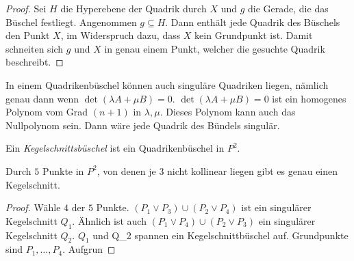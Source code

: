 \documentclass[../main.tex]{subfiles}
\begin{document}
\begin{proof}
Sei $H$ die Hyperebene der Quadrik durch $X$ und $g$ die Gerade, die das Büschel festliegt. Angenommen $g\subseteq H$. Dann enthält jede Quadrik des Büschels den Punkt $X$, im Widerspruch dazu, dass $X$ kein Grundpunkt ist. Damit schneiten sich $g$ und $X$ in genau einem Punkt, welcher die gesuchte Quadrik beschreibt.
\end{proof}
\begin{remark}
In einem Quadrikenbüschel können auch singuläre Quadriken liegen, nämlich genau dann wenn $\det(\lambda A +\mu B) = 0$. $\det(\lambda A +\mu B) = 0$ ist ein homogenes Polynom vom Grad $(n+1)$ in $\lambda, \mu$. Dieses Polynom kann auch das Nullpolynom sein. Dann wäre jede Quadrik des Bündels singulär.
\end{remark}
\begin{definition}
Ein \textit{Kegelschnittsbüschel} ist ein Quadrikenbüschel in $P^2$. 
\end{definition}
\begin{theorem}
Durch $5$ Punkte in $P^2$, von denen je $3$ nicht kollinear liegen gibt es genau einen Kegelschnitt. 
\end{theorem}
\begin{proof}
Wähle $4$ der $5$ Punkte. $(P_1\lor P_3)\cup (P_2\lor P_4)$ ist ein singulärer Kegelschnitt $Q_1$. Ähnlich ist auch $(P_1\lor P_4)\cup (P_2\lor P_3)$ ein singulärer Kegelschnitt $Q_2$. $Q_1$ und Q_2 spannen ein Kegelschnittbüschel auf. Grundpunkte sind $P_1,\dots, P_4$. Aufgrun
\end{proof}
\end{document}
